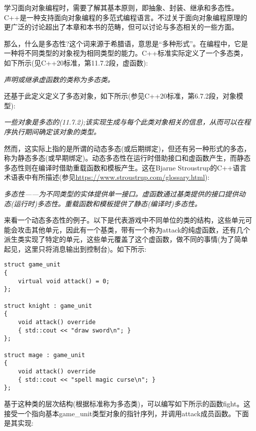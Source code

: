 学习面向对象编程时，需要了解其基本原则，即抽象、封装、继承和多态性。C++是一种支持面向对象编程的多范式编程语言。不过关于面向对象编程原理的更广泛的讨论超出了本章和本书的范畴，但可以讨论与多态相关的一些方面。

那么，什么是多态性?这个词来源于希腊语，意思是“多种形式”。在编程中，它是一种将不同类型的对象视为相同类型的能力。C++标准实际定义了一个多态类，如下所示(见C++20标准，第11.7.2段，虚函数):

\begin{center}
\textit{
声明或继承虚函数的类称为多态类。
}
\end{center}

还基于此定义定义了多态对象，如下所示(参见C++20标准，第6.7.2段，对象模型):

\begin{center}
\textit{
一些对象是多态的(11.7.2);该实现生成与每个此类对象相关的信息，从而可以在程序执行期间确定该对象的类型。
}
\end{center}

然而，这实际上指的是所谓的动态多态(或后期绑定)，但还有另一种形式的多态，称为静态多态(或早期绑定)。动态多态性在运行时借助接口和虚函数产生，而静态多态性则在编译时借助重载函数和模板产生。这在Bjarne Stroustrup的C++语言术语表中有所描述(参见\url{https://www.stroustrup.com/glossary.html}):

\begin{center}
\textit{
多态性——为不同类型的实体提供单一接口。虚函数通过基类提供的接口提供动态(运行时)多态性。重载函数和模板提供了静态(编译时)多态性。
}
\end{center}

来看一个动态多态性的例子。以下是代表游戏中不同单位的类的结构，这些单元可能会攻击其他单元，因此有一个基类，带有一个称为attack的纯虚函数，还有几个派生类实现了特定的单元，这些单元覆盖了这个虚函数，做不同的事情(为了简单起见，这里只将消息输出到控制台)。如下所示:

\begin{lstlisting}[style=styleCXX]
struct game_unit
{
	virtual void attack() = 0;
};

struct knight : game_unit
{
	void attack() override
	{ std::cout << "draw sword\n"; }
};

struct mage : game_unit
{
	void attack() override
	{ std::cout << "spell magic curse\n"; }
};
\end{lstlisting}

基于这种类的层次结构(根据标准称为多态类)，可以编写如下所示的函数fight。这接受一个指向基本game\_unit类型对象的指针序列，并调用attack成员函数。下面是其实现:

